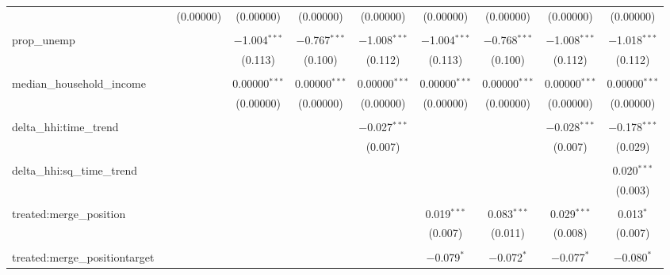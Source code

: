 \begin{table}[H]
{\begin{tabular}{@{\extracolsep{5pt}}lccccccccc}
   &  & (0.00000) & (0.00000) & (0.00000) & (0.00000) & (0.00000) & (0.00000) & (0.00000) & (0.00000) \\  

   & & & & & & & & & \\  

  prop\_unemp &  &  & $-$1.004$^{***}$ & $-$0.767$^{***}$ & $-$1.008$^{***}$ & $-$1.004$^{***}$ & $-$0.768$^{***}$ & $-$1.008$^{***}$ & $-$1.018$^{***}$ \\  

   &  &  & (0.113) & (0.100) & (0.112) & (0.113) & (0.100) & (0.112) & (0.112) \\  

   & & & & & & & & & \\  

  median\_household\_income &  &  & 0.00000$^{***}$ & 0.00000$^{***}$ & 0.00000$^{***}$ & 0.00000$^{***}$ & 0.00000$^{***}$ & 0.00000$^{***}$ & 0.00000$^{***}$ \\  

   &  &  & (0.00000) & (0.00000) & (0.00000) & (0.00000) & (0.00000) & (0.00000) & (0.00000) \\  

   & & & & & & & & & \\  

  delta\_hhi:time\_trend &  &  &  &  & $-$0.027$^{***}$ &  &  & $-$0.028$^{***}$ & $-$0.178$^{***}$ \\  

   &  &  &  &  & (0.007) &  &  & (0.007) & (0.029) \\  

   & & & & & & & & & \\  

  delta\_hhi:sq\_time\_trend &  &  &  &  &  &  &  &  & 0.020$^{***}$ \\  

   &  &  &  &  &  &  &  &  & (0.003) \\  

   & & & & & & & & & \\  

  treated:merge\_position &  &  &  &  &  & 0.019$^{***}$ & 0.083$^{***}$ & 0.029$^{***}$ & 0.013$^{*}$ \\  

   &  &  &  &  &  & (0.007) & (0.011) & (0.008) & (0.007) \\  

   & & & & & & & & & \\  

  treated:merge\_positiontarget &  &  &  &  &  & $-$0.079$^{*}$ & $-$0.072$^{*}$ & $-$0.077$^{*}$ & $-$0.080$^{*}$ \\  


\end{tabular}}
\end{table}
